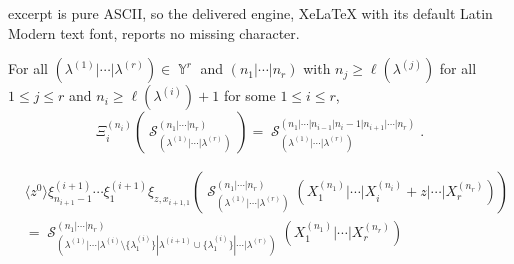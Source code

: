 \documentclass[10pt,a4paper]{amsart}
\DeclareMathOperator{\Par}{\mathbb{Y}}
\DeclareMathOperator{\cS}{\mathcal{S}}
\begin{document}
excerpt is pure ASCII, so the delivered engine, XeLaTeX with its default Latin Modern text font, reports no missing character.
\begin{lem}\label{mutlisym stability lemma}
    For all $(\lambda^{(1)}|\cdots |\lambda^{(r)}) \in \Par^r$ and $(n_1|\cdots|n_r)$ with $n_j \geq \ell(\lambda^{(j)})$ for all $1\leq j \leq r$ and $n_i \geq \ell(\lambda^{(i)})+1$ for some $1 \leq i \leq r$, 
    $$\Xi_{i}^{(n_i)}\left(\cS_{(\lambda^{(1)}|\cdots |\lambda^{(r)})}^{(n_1|\cdots|n_r)} \right) = \cS_{(\lambda^{(1)}|\cdots |\lambda^{(r)})}^{(n_1|\cdots|n_{i-1}|n_i-1|n_{i+1}|\cdots|n_r)}.$$ 
\end{lem}

\begin{lem}
\begin{align*}
    &\langle z^0 \rangle\xi^{(i+1)}_{n_{i+1}-1}\cdots \xi^{(i+1)}_{1} \xi_{z,x_{i+1,1}}\left( \cS_{(\lambda^{(1)}|\cdots |\lambda^{(r)})}^{(n_1|\cdots|n_r)} (X_1^{(n_1)}|\cdots| X_{i}^{(n_i)}+z|\cdots |X_r^{(n_r)}) \right)\\
    &= \cS_{(\lambda^{(1)}|\cdots|\lambda^{(i)}\setminus \{\lambda^{(i)}_{1}\}|\lambda^{(i+1)} \cup \{\lambda^{(i)}_{1}\}|\cdots |\lambda^{(r)})}^{(n_1|\cdots|n_r)} (X_1^{(n_1)}|\cdots|X_r^{(n_r)})\\
\end{align*}
   
\end{lem}
\end{document}
